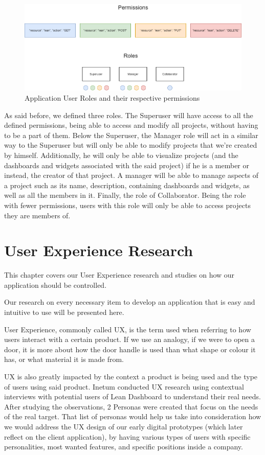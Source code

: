 \documentclass[a4paper,twoside,10pt]{report}
\begin{document}
\begin{figure}[h!]
\center
  \includegraphics[width=\textwidth]{lean-rbac-model.png}
\caption{Application User Roles and their respective permissions}
\end{figure}
As said before, we defined three roles. The Superuser will have access to all the defined permissions, being able to access and modify all projects, without having to be a part of them. 
Below the Superuser, the Manager role will act in a similar way to the Superuser but will only be able to modify projects that we're created by himself. Additionally, he will only be able to visualize projects (and the dashboards and widgets associated with the said project) if he is a member or instead, the creator of that project. A manager will be able to manage aspects of a project such as its name, description, containing dashboards and widgets, as well as all the members in it.
Finally, the role of Collaborator. Being the role with fewer permissions, users with this role will only be able to access projects they are members of.

\chapter{User Experience Research}
This chapter covers our User Experience research and studies on how our application should be controlled.

Our research on every necessary item to develop an application that is easy and intuitive to use will be presented here.

User Experience, commonly called UX, is the term used when referring to how users interact with a certain product. If we use an analogy, if we were to open a door, it is more about how the door handle is used than what shape or colour it has, or what material it is made from. 

UX is also greatly impacted by the context a product is being used and the type of users using said product. Inetum conducted UX research using contextual interviews with potential users of Lean Dashboard to understand their real needs. After studying the observations, 2 Personas were created that focus on the needs of the real target. That list of personas would help us take into consideration how we would address the UX design of our early digital prototypes (which later reflect on the client application), by having various types of users with specific personalities, most wanted features, and specific positions inside a company. 
\end{document}
